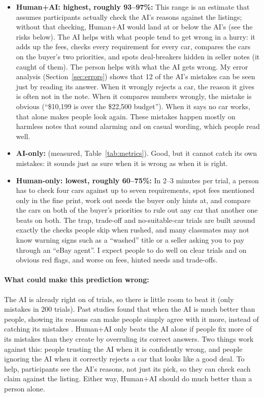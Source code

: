 \documentclass[11pt]{article}
\begin{document}
\begin{itemize}
  \item \textbf{Human+AI: highest, roughly 93--97\%:} This range is an estimate that assumes
  participants actually check the AI's reasons against the listings; without that checking, Human+AI
  would land at or below the AI's \FtAcc{} (see the risks below). The AI helps with what people tend to get
  wrong in a hurry: it adds up the fees, checks every requirement for every car, compares the cars
  on the buyer's two priorities, and spots deal-breakers hidden in seller notes (it caught
  \FtFlagRecall{} of them). The person helps with what the AI gets wrong. My error analysis
  (Section~\ref{sec:errors}) shows that 12 of the AI's \FtErrors{} mistakes can be seen just by
  reading its answer. When it wrongly rejects a car, the reason it gives is often not in the note.
  When it compares numbers wrongly, the mistake is obvious (``\$10,199 is over the \$22,500
  budget''). When it says no car works, that alone makes people look again. These mistakes
  happen mostly on harmless notes that sound alarming and on casual wording, which people read
  well.
  \item \textbf{AI-only: \FtAcc{}} (measured, Table~\ref{tab:metrics}). Good, but it cannot catch
  its own mistakes: it sounds just as sure when it is wrong as when it is right.
  \item \textbf{Human-only: lowest, roughly 60--75\%:} In 2--3 minutes per trial, a person has
  to check four cars against up to seven requirements, spot fees mentioned only in the fine print,
  work out needs the buyer only hints at, and compare the cars on both of the buyer's priorities to
  rule out any car that another one beats on both. The trap, trade-off and no-suitable-car trials
  are built around exactly the checks people skip when rushed, and many classmates may not know
  warning signs such as a ``washed'' title or a seller asking you to pay through an ``eBay agent''.
  I expect people to do well on clear trials and on obvious red flags, and worse on fees, hinted
  needs and trade-offs.
\end{itemize}

\paragraph{What could make this prediction wrong:} The AI is already right on \FtAcc{} of trials,
so there is little room to beat it (only \FtErrors{} mistakes in 200 trials). Past studies found
that when the AI is much better than people, showing its reasons can make people simply agree
with it more, instead of catching its mistakes \cite{bansal, bucinca}. Human+AI only beats the AI
alone if people fix more of its mistakes than they create by overruling its correct answers. Two
things work against this: people trusting the AI when it is confidently wrong, and people
ignoring the AI when it correctly rejects a car that looks like a good deal. To help, participants
see the AI's reasons, not just its pick, so they can check each claim against the listing.
Either way, Human+AI should do much better than a person alone.
\end{document}
